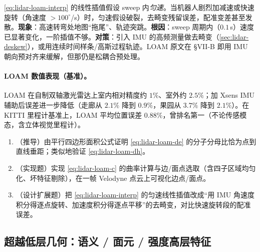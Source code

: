 \begin{pitfall}
\cref{eq:lidar-loam-interp} 的线性插值假设 sweep 内\emph{匀速}。当机器人剧烈加减速或快速旋转（角速度 $>100^\circ$/s）时，匀速假设破裂，去畸变残留误差，配准变差甚至发散。\textbf{现象}：高速转弯处地图“拖尾”、轨迹突跳。\textbf{根因}：sweep 周期内（$0.1$\,s）速度已显著变化，一阶插值不够。\textbf{对策}：引入 IMU 的高频测量做去畸变（\cref{sec:lidar-deskew}），或用连续时间样条/高斯过程轨迹。LOAM 原文在 §VII-B 即用 IMU 朝向预对齐来缓解，但那仍是松耦合预处理。
\end{pitfall}

\paragraph{LOAM 数值表现（基准）。}
LOAM 在自制双轴激光雷达上室内相对精度约 $1\%$、室外约 $2.5\%$\cite{zhang2014loam}；加 Xsens IMU 辅助后误差进一步降低（走廊从 $2.1\%$ 降到 $0.9\%$，果园从 $3.7\%$ 降到 $2.1\%$）。在 KITTI 里程计基准上，LOAM 平均位置误差 $0.88\%$，曾排名第一（不论传感模态，含立体视觉里程计）。

\begin{practice}
\begin{enumerate}
  \item （推导）由平行四边形面积公式证明 \cref{eq:lidar-loam-de} 的分子分母比恰为点到直线垂距；类似地验证 \cref{eq:lidar-loam-dh}。
  \item （实现题）实现 \cref{eq:lidar-loam-c} 的曲率计算与边/面点选取（含四子区域均匀化、坏特征剔除），在一帧 Velodyne 点云上可视化边点/面点。
  \item （设计扩展题）把 \cref{eq:lidar-loam-interp} 的匀速线性插值改成“用 IMU 角速度积分得逐点旋转、加速度积分得逐点平移”的去畸变，对比快速旋转段的配准误差。
\end{enumerate}
\end{practice}

\subsection{超越低层几何：语义 / 面元 / 强度高层特征}
\label{sec:lidar-highfeat}

